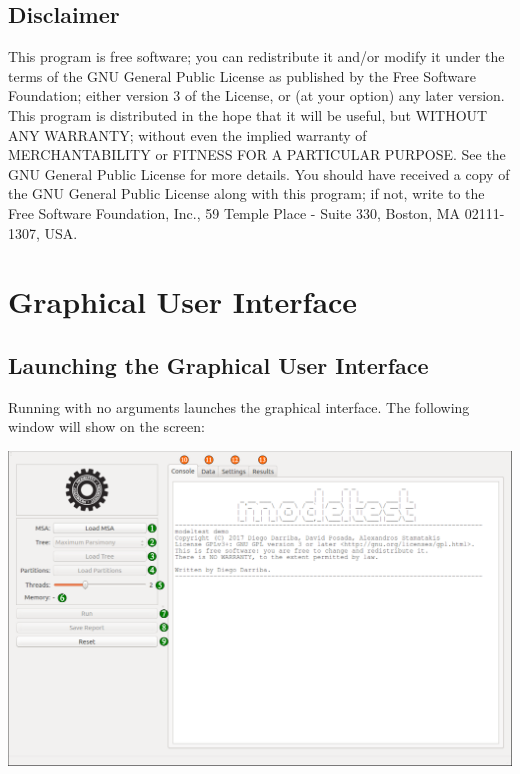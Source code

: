 \documentclass[10pt,twoside,a4paper]{article}
\begin{document}


\subsection{Disclaimer}

{\footnotesize
This program is free software; you can redistribute it and/or modify it under the terms of the GNU General Public License as published by the Free Software Foundation;
either version 3 of the License, or (at your option) any later version. This program is distributed in the hope that it will be useful, but WITHOUT ANY WARRANTY;
without even the implied warranty of MERCHANTABILITY or FITNESS FOR A PARTICULAR PURPOSE. See the GNU General Public License for more details.
You should have received a copy of the GNU General Public License along with this program; if not, write to the Free Software Foundation, Inc., 59 Temple Place - Suite 330, Boston, MA 02111-1307, USA.
}


{\footnotesize

}





\section{Graphical User Interface}
\label{sec:gui}

\subsection{Launching the Graphical User Interface}

Running {\modeltestguibin} with no arguments launches the graphical interface.
The following window will show on the screen:

\begin{center}
\includegraphics[width=.9\textwidth]{images/main-window}
\end{center}
\end{document}
